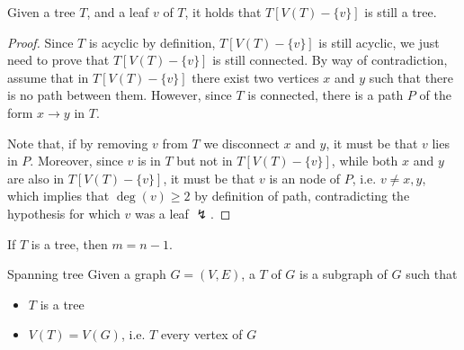\documentclass[a4paper, 12pt]{report}
\begin{document}
    \begin{framedlem}[label={tree without leaf}]{}
        Given a tree $T$, and a leaf $v$ of $T$, it holds that $T[V(T) - \{v\}]$ is still a tree.
    \end{framedlem}

    \begin{proof}
        Since $T$ is acyclic by definition, $T[V(T) - \{v\}]$ is still acyclic, we just need to prove that $T[V(T) - \{v\}]$ is still connected. By way of contradiction, assume that in $T[V(T) - \{v\}]$ there exist two vertices $x$ and $y$ such that there is no path between them. However, since $T$ is connected, there is a path $P$ of the form $x \to y$ in $T$.

        Note that, if by removing $v$ from $T$ we disconnect $x$ and $y$, it must be that $v$ lies in $P$. Moreover, since $v$ is in $T$ but not in $T[V(T) - \{v\}]$, while both $x$ and $y$ are also in $T[V(T) - \{v\}]$, it must be that $v$ is an  node of $P$, i.e. $v \neq x, y$, which implies that $\deg(v) \ge 2$ by definition of path, contradicting the hypothesis for which $v$ was a leaf $\lightning$.
    \end{proof}

    \begin{framedprop}[label={m n - 1}]{}
        If $T$ is a tree, then $m = n - 1$.
    \end{framedprop}


    \begin{frameddefn}{Spanning tree}
        Given a graph $G = (V, E)$, a  $T$ of $G$ is a subgraph of $G$ such that

        \begin{itemize}
            \item $T$ is a tree
            \item $V(T) = V(G)$, i.e. $T$  every vertex of $G$
        \end{itemize}
    \end{frameddefn}
\end{document}
